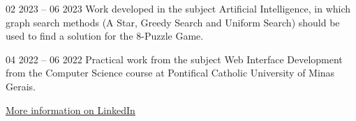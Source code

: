 {
}{02 2023 -- 06 2023}{}
Work developed in the subject Artificial Intelligence, in which graph search methods (A Star, Greedy Search and Uniform Search) should be used to find a solution for the 8-Puzzle Game.\\
\divider

{
}{04 2022 -- 06 2022}{}
Practical work from the subject Web Interface Development from the Computer Science course at Pontifical Catholic University of Minas Gerais.\\
\divider

{\large\color{emphasis}\href{https://www.linkedin.com/in/henriquemcc/details/projects/}{More information on LinkedIn}}